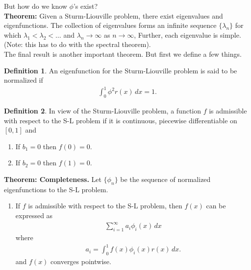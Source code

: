 \documentclass{article}
\theoremstyle{definition}
\newtheorem{defn}{Definition}[section]
\begin{document}
But how do we know $\phi$'s exist?\\

\textbf{Theorem:} Given a Sturm-Liouville problem, there exist eigenvalues and eigenfunctions. The collection of eigenvalues forms an infinite sequence $\{\lambda_n\}$ for which $\lambda_1<\lambda_2 <\dots$ and $\lambda_n\to \infty$ as $n\to\infty$, Further, each eigenvalue is simple. (Note: this has to do with the spectral theorem).\\

The final result is another important theorem. But first we define a few things. 
\begin{defn}
	An eigenfunction for the Sturm-Liouville problem is said to be normalized if 
	\begin{align*}
	\int^1_0 \phi^2 r(x)\,dx = 1.
	\end{align*}
\end{defn}

\begin{defn}
	In view of the Sturm-Liouville problem, a function $f$ is admissible with respect to the S-L problem if it is continuous, piecewise differentiable on $[0,1]$ and 
	\begin{enumerate}
		\item If $b_1 = 0$ then $f(0) = 0$.
		\item If $b_2 = 0$ then $f(1) = 0$.
	\end{enumerate}
\end{defn}

\textbf{Theorem: Completeness.} Let $\{ \phi_n\}$ be the sequence of normalized eigenfunctions to the S-L problem. 
\begin{enumerate}
	\item If $f$ is admissible with respect to the S-L problem, then $f(x)$ can be expressed as
	\begin{align*}
	\sum_{i=1}^\infty a_i \phi_i(x)\,dx
	\end{align*}
	where
	\begin{align*}
	a_i = \int^1_0 f(x)\phi_i(x)r(x)\,dx.
	\end{align*}
	and $f(x)$ converges pointwise. 
\end{enumerate}
\end{document}
